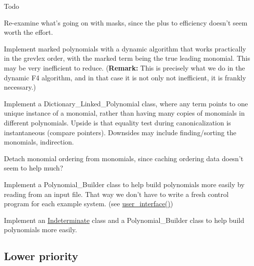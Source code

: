 \begin{DoxyRefDesc}{Todo}
\begin{DoxyItemize}
\item Re-\/examine what's going on with masks, since the plus to efficiency doesn't seem worth the effort.
\item Implement marked polynomials with a dynamic algorithm that works practically in the grevlex order, with the marked term being the true leading monomial. This may be very inefficient to reduce. ({\bfseries Remark\+:} This is precisely what we do in the dynamic F4 algorithm, and in that case it is not only not inefficient, it is frankly necessary.)
\item Implement a {\ttfamily Dictionary\+\_\+\+Linked\+\_\+\+Polynomial} class, where any term points to one unique instance of a monomial, rather than having many copies of monomials in different polynomials. Upside is that equality test during canonicalization is instantaneous (compare pointers). Downsides may include finding/sorting the monomials, indirection.
\item Detach monomial ordering from monomials, since caching ordering data doesn't seem to help much?
\item Implement a {\ttfamily Polynomial\+\_\+\+Builder} class to help build polynomials more easily by reading from an input file. That way we don't have to write a fresh control program for each example system. (see {\ttfamily \hyperlink{group__utils_ga72d205e8226d578b892515edc527cc83}{user\+\_\+interface()}})
\item Implement an \hyperlink{group__polygroup_class_indeterminate}{Indeterminate} class and a {\ttfamily Polynomial\+\_\+\+Builder} class to help build polynomials more easily.
\end{DoxyItemize}\end{DoxyRefDesc}
\hypertarget{index_lopri}{}\subsection{Lower priority}\label{index_lopri}
